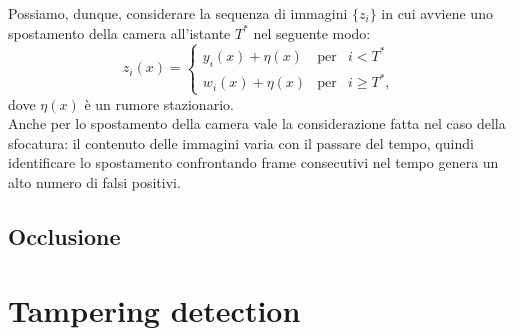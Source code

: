 Possiamo, dunque, considerare la sequenza di immagini $\{z_i\}$ in cui avviene uno spostamento della camera all'istante $T^*$ nel seguente modo:
\begin{equation}
\label{eq:displacement}
z_i(x) = \left\{ \begin{array}{rcl}
	y_i(x) + \eta(x) & \mbox{per} & i < T^* \\
	w_i(x) + \eta(x) & \mbox{per} & i \geqslant T^*,
	\end{array}\right.
\end{equation}
dove $\eta(x)$ \`e un rumore stazionario.\\
Anche per lo spostamento della camera vale la considerazione fatta nel caso della sfocatura: il contenuto delle immagini varia con il passare del tempo, quindi identificare lo spostamento confrontando frame consecutivi nel tempo genera un alto numero di falsi positivi.

\subsection{Occlusione}
\section{Tampering detection}
